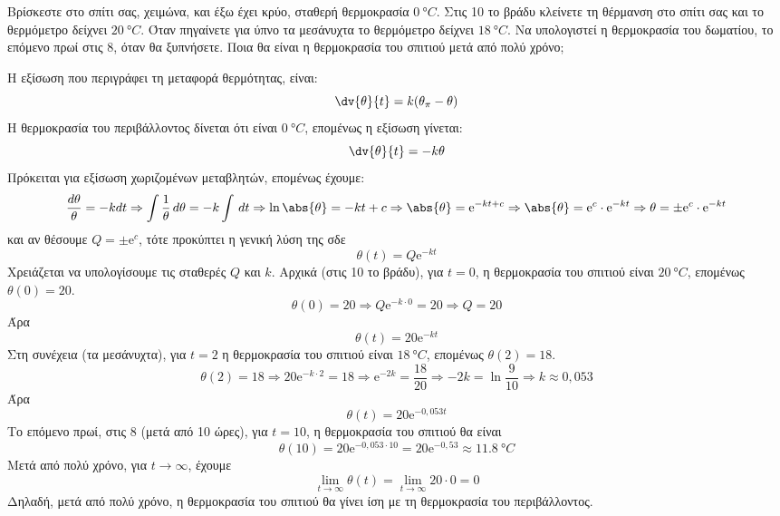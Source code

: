 \begin{problem}
  Βρίσκεστε στο σπίτι σας, χειμώνα, και έξω έχει κρύο, σταθερή θερμοκρασία 
  $ \SI{0}{\degree C} $. Στις 10 το βράδυ κλείνετε τη θέρμανση στο σπίτι σας 
  και το θερμόμετρο δείχνει $ \SI{20}{\degree C} $. Όταν πηγαίνετε για ύπνο 
  τα μεσάνυχτα το θερμόμετρο δείχνει $ \SI{18}{\degree C} $. Να υπολογιστεί η
  θερμοκρασία του δωματίου, το επόμενο πρωί στις 8, όταν θα ξυπνήσετε. Ποια θα είναι 
  η θερμοκρασία του σπιτιού μετά από πολύ χρόνο;
\end{problem}
\begin{solution}
  Η εξίσωση που περιγράφει τη μεταφορά θερμότητας, είναι:
  \[
    \dv{\theta}{t} = k (\theta _{\pi} - \theta)
  \] 
  Η θερμοκρασία του περιβάλλοντος δίνεται ότι είναι 
  $ \SI{0}{\degree C} $, επομένως η εξίσωση γίνεται: 
  \[
    \dv{\theta}{t} = - k \theta  
  \] 
  Πρόκειται για εξίσωση χωριζομένων μεταβλητών, επομένως έχουμε:
  \[
    \frac{d \theta}{\theta} = - k dt \Rightarrow \int \frac{1}{\theta} \,{d \theta } 
    = -k \int  \,{dt} \Rightarrow \ln{\abs{\theta}} = - kt + c \Rightarrow \abs{\theta} 
    = \mathrm{e}^{-kt+c} \Rightarrow \abs{\theta} = \mathrm{e}^{c} \cdot \mathrm{e}^{-kt}
    \Rightarrow \theta = \pm \mathrm{e}^{c} \cdot \mathrm{e}^{-kt} 
  \] 
  και αν θέσουμε $ Q = \pm \mathrm{e}^{c} $, τότε προκύπτει η γενική λύση της σδε
  \[
    \theta(t) = Q \mathrm{e}^{-kt} 
  \]
  Χρειάζεται να υπολογίσουμε τις σταθερές $ Q $ και $ k $. 
  Αρχικά (στις 10 το βράδυ), για $ t=0 $, η θερμοκρασία του σπιτιού είναι 
  $ \SI{20}{\degree C} $, επομένως $ \theta (0) = 20 $. 
  \[
    \theta (0) = 20 \Rightarrow Q \mathrm{e}^{-k\cdot 0} = 20 \Rightarrow Q = 20
  \] 
  Άρα 
  \[
    \theta (t) = 20 \mathrm{e}^{-kt} 
  \] 
  Στη συνέχεια (τα μεσάνυχτα), για $ t=2 $ η θερμοκρασία του σπιτιού είναι $
  \SI{18}{\degree C} $, επομένως $ \theta (2) = 18 $.
  \[
    \theta (2) = 18 \Rightarrow 20 \mathrm{e}^{-k\cdot 2} = 18 \Rightarrow
    \mathrm{e}^{-2k} = \frac{18}{20} \Rightarrow -2k = \ln{\frac{9}{10}} \Rightarrow 
    k \approx 0,053
  \] 
  Άρα 
  \[
    \theta (t) = 20 \mathrm{e}^{-0,053 t} 
  \] 
  Το επόμενο πρωί, στις 8 (μετά από 10 ώρες), για $ t=10 $, η θερμοκρασία του σπιτιού 
  θα είναι 
  \[
    \theta (10) = 20 \mathrm{e}^{-0,053\cdot 10} = 20 \mathrm{e}^{-0,53} \approx 
    \SI{11,8}{\degree C}
  \] 
  Μετά από πολύ χρόνο, για $ t \to \infty $, έχουμε 
  \[
    \lim_{t \to \infty} \theta (t) = \lim_{t \to \infty} 20 \cdot 0 = 0
  \] 
  Δηλαδή, μετά από πολύ χρόνο, η θερμοκρασία του σπιτιού θα γίνει ίση με τη 
  θερμοκρασία του περιβάλλοντος.
\end{solution}


